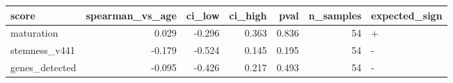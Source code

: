 \begin{tabular}{lrrrrrl}
\toprule
score & spearman_vs_age & ci_low & ci_high & pval & n_samples & expected_sign \\
\midrule
maturation & 0.029 & -0.296 & 0.363 & 0.836 & 54 & + \\
stemness_v441 & -0.179 & -0.524 & 0.145 & 0.195 & 54 & - \\
genes_detected & -0.095 & -0.426 & 0.217 & 0.493 & 54 & - \\
\bottomrule
\end{tabular}
